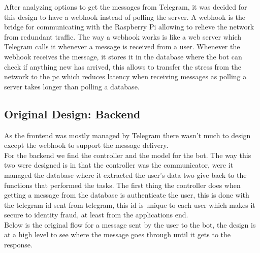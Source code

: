 After analyzing options to get the messages from Telegram, it was decided for this design to have a webhook instead of polling the server. A webhook is the bridge for communicating with the Raspberry Pi allowing to relieve the network from redundant traffic. The way a webhook works is like a web server which Telegram calls it whenever a message is received from a user. Whenever the webhook receives the message, it stores it in the database where the bot can check if anything new has arrived, this allows to transfer the stress from the network to the pc which reduces latency when receiving messages as polling a server takes longer than polling a database.

\subsection{Original Design: Backend}\label{sec:chap4_ori_des_back}

As the frontend was mostly managed by Telegram there wasn’t much to design except the webhook to support the message delivery.\\

For the backend we find the controller and the model for the bot. The way this two were designed is in that the controller was the communicator, were it managed the database where it extracted the user’s data two give back to the functions that performed the tasks. The first thing the controller does when getting a message from the database is authenticate the user, this is done with the telegram id sent from telegram, this id is unique to each user which makes it secure to identity fraud, at least from the applications end.\\
 
Below is the original flow for a message sent by the user to the bot, the design is at a high level to see where the message goes through until it gets to the response.

